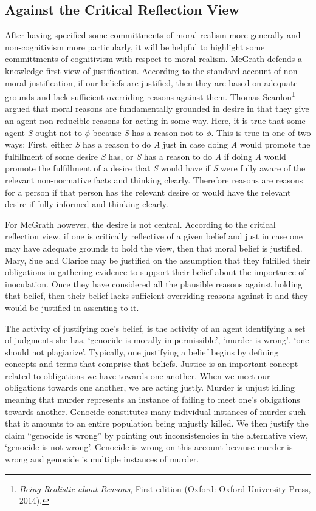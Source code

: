 \documentclass[phdthesis,12pt,final]{wuthesis}
\theoremstyle{definition}
\theoremstyle{definition}
\theoremstyle{definition}
\theoremstyle{definition}
\theoremstyle{remark}
\begin{document}
\subsection*{Against the Critical Reflection View}\label{against-the-critical-reflection-view}

After having specified some committments of moral realism more generally and non-cognitivism more particularly, it will be helpful to highlight some committments of cognitivism with respect to moral realism. McGrath defends a knowledge first view of justification. According to the standard account of non-moral justification, if our beliefs are justified, then they are based on adequate grounds and lack sufficient overriding reasons against them. Thomas Scanlon\footnote{\emph{Being Realistic about Reasons}, First edition (Oxford: Oxford University Press, 2014).} argued that moral reasons are fundamentally grounded in desire in that they give an agent non-reducible reasons for acting in some way. Here, it is true that some agent \emph{S} ought not to \(\phi\) because \emph{S} has a reason not to \(\phi\). This is true in one of two ways: First, either \emph{S} has a reason to do \emph{A} just in case doing \emph{A} would promote the fulfillment of some desire \emph{S} has, or \emph{S} has a reason to do \emph{A} if doing \emph{A} would promote the fulfillment of a desire that \emph{S} would have if \emph{S} were fully aware of the relevant non-normative facts and thinking clearly. Therefore reasons are reasons for a person if that person has the relevant desire or would have the relevant desire if fully informed and thinking clearly.

For McGrath however, the desire is not central. According to the critical reflection view, if one is critically reflective of a given belief and just in case one may have adequate grounds to hold the view, then that moral belief is justified. Mary, Sue and Clarice may be justified on the assumption that they fulfilled their obligations in gathering evidence to support their belief about the importance of inoculation. Once they have considered all the plausible reasons against holding that belief, then their belief lacks sufficient overriding reasons against it and they would be justified in assenting to it.

The activity of justifying one's belief, is the activity of an agent identifying a set of judgments she has, `genocide is morally impermissible', `murder is wrong', `one should not plagiarize'. Typically, one justifying a belief begins by defining concepts and terms that comprise that beliefs. Justice is an important concept related to obligations we have towards one another. When we meet our obligations towards one another, we are acting justly. Murder is unjust killing meaning that murder represents an instance of failing to meet one's obligations towards another. Genocide constitutes many individual instances of murder such that it amounts to an entire population being unjustly killed. We then justify the claim ``genocide is wrong'' by pointing out inconsistencies in the alternative view, `genocide is not wrong'. Genocide is wrong on this account because murder is wrong and genocide is multiple instances of murder.
\end{document}
